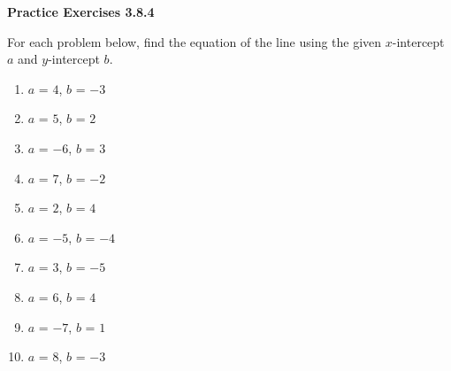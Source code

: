  \vspace{1ex}
\noindent\textbf{Practice Exercises 3.8.4}

\vspace{0.75ex}

For each problem below, find the equation of the line using the given $x$-intercept $a$ and $y$-intercept $ b $.
\begin{multicols}{2}
\begin{enumerate}[noitemsep, label = \color{blue}\arabic*. ]
    \item $ a $ = $4$, $ b $ = $-3$
    \item $ a $ = $5$, $ b $ = $2$
    \item $ a $ = $-6$, $ b $ = $3$
    \item $ a $ = $7$, $ b $ = $-2$
    \item $ a $ = $2$, $ b $ = $4$
    \item $ a $ = $-5$, $ b $ = $-4$
    \item $ a $ = $3$, $ b $ = $-5$
    \item $ a $ = $6$, $ b $ = $4$
    \item $ a $ = $-7$, $ b $ = $1$
    \item $ a $ = $8$, $ b $ = $-3$
\end{enumerate}
\end{multicols}
